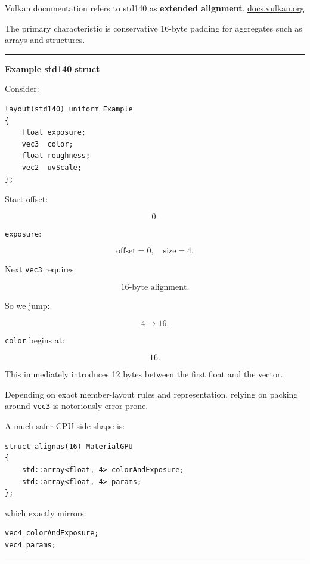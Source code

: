 Vulkan documentation refers to std140 as \textbf{extended alignment}. \href{https://docs.vulkan.org/guide/latest/shader_memory_layout.html?utm_source=chatgpt.com}{docs.vulkan.org}

The primary characteristic is conservative 16-byte padding for aggregates such as arrays and structures.

\begin{center}\rule{0.5\linewidth}{0.5pt}\end{center}

\textbf{Example std140 struct}

Consider:

\begin{verbatim}
layout(std140) uniform Example
{
    float exposure;
    vec3  color;
    float roughness;
    vec2  uvScale;
};
\end{verbatim}

Start offset:

\[
0.
\]

\texttt{exposure}:

\[
\text{offset}=0,\quad\text{size}=4.
\]

Next \texttt{vec3} requires:

\[
16\text{-byte alignment}.
\]

So we jump:

\[
4\rightarrow16.
\]

\texttt{color} begins at:

\[
16.
\]

This immediately introduces 12 bytes between the first float and the vector.

Depending on exact member-layout rules and representation, relying on packing around \texttt{vec3} is notoriously error-prone.

A much safer CPU-side shape is:

\begin{verbatim}
struct alignas(16) MaterialGPU
{
    std::array<float, 4> colorAndExposure;
    std::array<float, 4> params;
};
\end{verbatim}

which exactly mirrors:

\begin{verbatim}
vec4 colorAndExposure;
vec4 params;
\end{verbatim}

\begin{center}\rule{0.5\linewidth}{0.5pt}\end{center}

